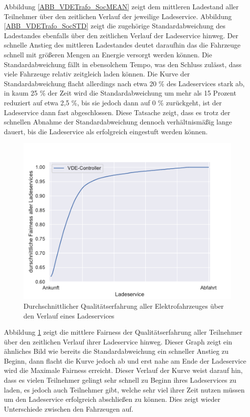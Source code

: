 Abbildung \ref{ABB_VDETrafo_SocMEAN} zeigt dem mittleren Ladestand aller Teilnehmer über den zeitlichen Verlauf der jeweilige Ladeservice. Abbildung \ref{ABB_VDETrafo_SocSTD} zeigt die zugehörige Standardabweichung des Ladestandes ebenfalls über den zeitlichen Verlauf der Ladeservice hinweg. Der schnelle Anstieg des mittleren Ladestandes deutet daraufhin das die Fahrzeuge schnell mit größeren Mengen an Energie versorgt werden können. Die Standardabweichung fällt in ebensolchem Tempo, was den Schluss zulässt, dass viele Fahrzeuge relativ zeitgleich laden können. Die Kurve der Standardabweichung flacht allerdings nach etwa 20 \% des Ladeservices stark ab, in kaum 25 \% der Zeit wird die Standardabweichung um mehr als 15 Prozent reduziert auf etwa 2,5 \%, bis sie jedoch dann auf 0 \% zurückgeht, ist der Ladeservice dann fast abgeschlossen. Diese Tatsache zeigt, dass es trotz der schnellen Abnahme der Standardabweichung dennoch verhältnismäßig lange dauert, bis die Ladeservice als erfolgreich eingestuft werden können.\\
\begin{figure}[htb]
\centering
	\includegraphics[scale=0.6]{img/VDE_tau_trafo/tau_VDE_trafo_2_qoe.pdf}
	\caption{Durchschnittlicher Qualitätserfahrung aller Elektrofahrzeuges über den Verlauf eines Ladeservices}
	\label{Abb_VDETrafo_Fairness}
\end{figure}

Abbildung \ref{Abb_VDETrafo_Fairness} zeigt die mittlere Fairness der Qualitätserfahrung aller Teilnehmer über den zeitlichen Verlauf ihrer Ladeservice hinweg. Dieser Graph zeigt ein ähnliches Bild wie bereits die Standardabweichung ein schneller Anstieg zu Beginn, dann flacht die Kurve jedoch ab und erst nahe am Ende der Ladeservice wird die Maximale Fairness erreicht. Dieser Verlauf der Kurve weist darauf hin, dass es vielen Teilnehmer gelingt sehr schnell zu Beginn ihres Ladeservices zu laden, es jedoch auch Teilnehmer gibt, welche sehr viel ihrer Zeit nutzen müssen um den Ladeservice erfolgreich abschließen zu können. Dies zeigt wieder Unterschiede zwischen den Fahrzeugen auf.

